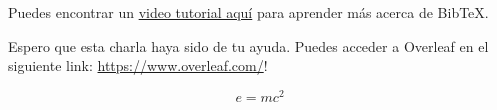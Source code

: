 \documentclass[a4paper]{article}
\begin{document}
Puedes encontrar un \href{https://www.overleaf.com/help/97-how-to-include-a-bibliography-using-bibtex}{video tutorial aquí} para aprender más acerca de BibTeX.

Espero que esta charla haya sido de tu ayuda. Puedes acceder a Overleaf en el siguiente link: \url{https://www.overleaf.com/}!




\blindtext 

\begin{equation}
\label{eq:emc}
e = mc^2
\end{equation}

\blindtext
\end{document}
